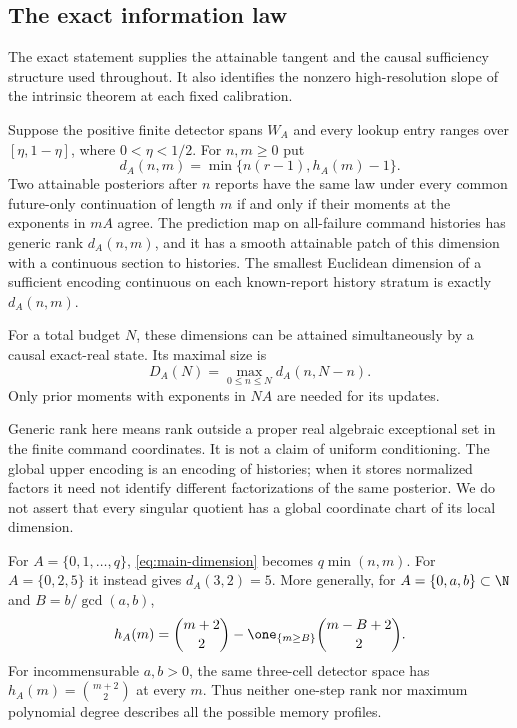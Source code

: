 \subsection{The exact information law}
The exact statement supplies the attainable tangent and the causal
sufficiency structure used throughout. It also identifies the nonzero
high-resolution slope of the intrinsic theorem at each fixed calibration.

\begin{theorem}\label{thm:main}
Suppose the positive finite detector spans $W_A$ and every lookup entry
ranges over $[\eta,1-\eta]$, where $0<\eta<1/2$. For $n,m\ge0$ put
\begin{equation}\label{eq:main-dimension}
 d_A(n,m)=\min\{n(r-1),h_A(m)-1\}.
\end{equation}
Two attainable posteriors after $n$ reports have the same law under every
common future-only continuation of length $m$ if and only if their moments
at the exponents in $mA$ agree. The prediction map on all-failure command
histories has generic rank $d_A(n,m)$, and it has a smooth attainable patch
of this dimension with a continuous section to histories. The smallest
Euclidean dimension of a sufficient encoding continuous on each
known-report history stratum is exactly $d_A(n,m)$.

For a total budget $N$, these dimensions can be attained simultaneously
by a causal exact-real state. Its maximal size is
\begin{equation}\label{eq:peak}
 D_A(N)=\max_{0\le n\le N}d_A(n,N-n).
\end{equation}
Only prior moments with exponents in $NA$ are needed for its updates.
\end{theorem}

Generic rank here means rank outside a proper real algebraic exceptional
set in the finite command coordinates. It is not a claim of uniform
conditioning. The global upper encoding is an encoding of histories;
when it stores normalized factors it need not identify different
factorizations of the same posterior. We do not assert that every singular
quotient has a global coordinate chart of its local dimension.

For $A=\{0,1,\ldots,q\}$, \eqref{eq:main-dimension} becomes
$q\min(n,m)$. For $A=\{0,2,5\}$ it instead gives $d_A(3,2)=5$.
More generally, for $A=\{0,a,b\}\subset\N$ and
$B=b/\gcd(a,b)$,
\begin{equation}\label{eq:three-intro}
 h_A(m)=\binom{m+2}{2}-\one_{\{m\ge B\}}\binom{m-B+2}{2}.
\end{equation}
For incommensurable $a,b>0$, the same three-cell detector space has
$h_A(m)=\binom{m+2}{2}$ at every $m$. Thus neither one-step rank nor
maximum polynomial degree describes all the possible memory profiles.

